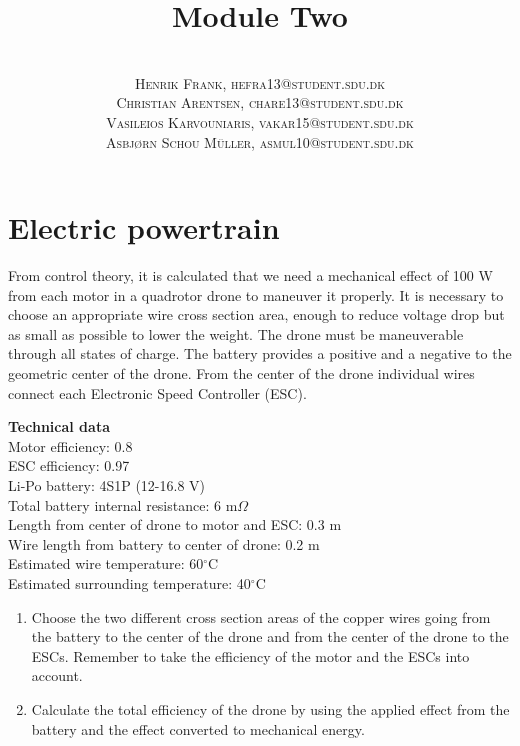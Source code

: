 \documentclass[paper=letter, fontsize=10pt]{article}
\title{\vspace{-15mm}\fontsize{24pt}{10pt}\selectfont\textbf{Module Two }} %
\author{
\large
{\textsc{}}\\[2mm]
{\textsc{Henrik Frank, hefra13@student.sdu.dk }}\\[2mm]
{\textsc{Christian Arentsen, chare13@student.sdu.dk }}\\[2mm]
{\textsc{Vasileios Karvouniaris, vakar15@student.sdu.dk }}\\[2mm]
{\textsc{Asbjørn Schou Müller, asmul10@student.sdu.dk }}
}
\date{}
\begin{document}
\maketitle %
\thispagestyle{fancy} %



\section{Electric powertrain}
From control theory, it is calculated that we need a mechanical effect of 100 W from each motor in a quadrotor drone to maneuver it properly. It is necessary to choose an appropriate wire cross section area, enough to reduce voltage drop but as small as possible to lower the weight. The drone must be maneuverable through all states of charge. The battery provides a positive and a negative  to the geometric center of the drone. From the center of the drone individual wires connect each Electronic Speed Controller (ESC).

\noindent \textbf{Technical data}\\
Motor efficiency: 0.8\\
ESC efficiency: 0.97\\
Li-Po battery: 4S1P (12-16.8 V)\\
Total battery internal resistance: 6 m${\Omega}$\\
Length from center of drone to motor and ESC: 0.3 m\\
Wire length from battery to center of drone: 0.2 m\\
Estimated wire temperature: 60$^{\circ}$C\\
Estimated surrounding temperature: 40$^{\circ}$C

\begin{enumerate}
\item Choose the two different cross section areas of the copper wires going from the battery to the center of the drone and from the center of the drone to the ESCs. Remember to take the efficiency of the motor and the ESCs into account.
\item Calculate the total efficiency of the drone by using the applied effect from the battery and the effect converted to mechanical energy.
\end{enumerate}
\end{document}
